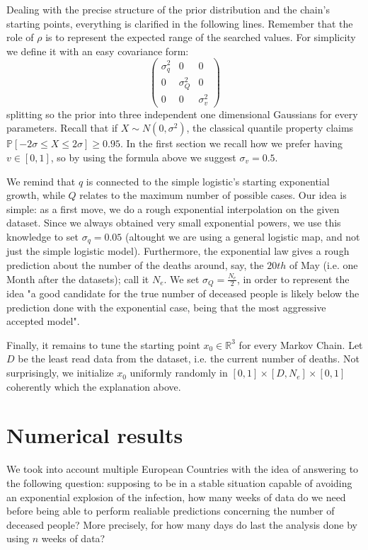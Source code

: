 \documentclass[8pt]{article}
\begin{document}
Dealing with the precise structure of the prior distribution and the
chain's starting points, everything is clarified in the following lines.
Remember that the role of $\rho$
is to represent the expected range of the searched values.
For simplicity we define it with an easy covariance form:
\begin{equation}
\begin{pmatrix}
	\sigma_q^2 & 0 & 0 \\
	0 & \sigma_Q^2 & 0 \\
	0 & 0 & \sigma_v^2
\end{pmatrix}
\end{equation}
splitting so the prior into three independent one dimensional Gaussians for
every parameters. Recall that if $X \sim N(0,\sigma^2)$, the classical
quantile property claims 
$\mathbb{P}[-2 \sigma \leq X \leq 2 \sigma] \geq 0.95$.
In the first section we recall how we prefer having $v \in [0,1]$, so by
using the formula above we suggest $\sigma_v = 0.5$.

We remind that $q$ is connected to the simple logistic's
 starting exponential growth, while $Q$ 
relates to the maximum number of possible cases. 
Our idea is simple: as a first move,
we do a rough exponential interpolation on the given dataset. 
Since we always obtained very small exponential powers,
we use this knowledge to set  $\sigma_q = 0.05$
(altought we are using a general logistic map, and not just the
simple logistic model).
Furthermore, the exponential law gives a rough
prediction about the number of the deaths around, say, the $20th$ of May
(i.e. one Month after the datasets); call it $N_e$.
We set $\sigma_Q = \frac{N_e}{2}$, in order to represent the idea
"a good candidate for the true number of deceased people is likely
below the prediction done with the exponential case, being that the
most aggressive accepted model".


Finally, it remains to tune the starting point $x_0 \in \mathbb{R}^3$
for every Markov Chain. Let $D$ be
the least read data from the dataset, i.e. the current
number of deaths.
Not surprisingly, we initialize $x_0$ uniformly randomly in
$[0, 1] \times [D, N_e] \times [0,1]$ coherently which the explanation above.


\section{Numerical results}
We took into account multiple European Countries with the idea of
answering to the following question:
supposing to be in a stable situation capable of avoiding
an exponential explosion of the infection, how many weeks of data do we need
before being able to perform realiable predictions concerning the
number of deceased people?
More precisely, for how many days do last the analysis done by using
$n$ weeks of data?
\end{document}
